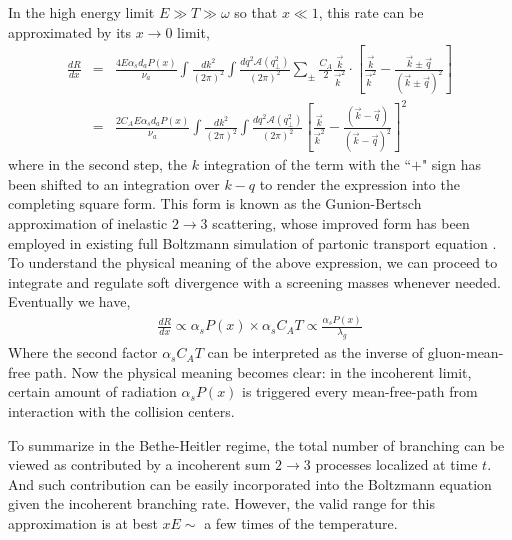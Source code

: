 In the high energy limit $E\gg T \gg \omega$ so that $x\ll 1$, this rate can be approximated by its $x\rightarrow 0$ limit, 
\begin{eqnarray}
\frac{dR}{dx} &=& \frac{4 E\alpha_s d_a P(x)}{\nu_a} \int \frac{dk^2}{(2\pi)^2} \int \frac{dq^2 \mathcal{A}(q_\perp^2)}{(2\pi)^2}  \sum_{\pm}
\frac{C_A}{2} \frac{\vec{k}}{\vec{k}^2}\cdot\left[\frac{\vec{k}}{\vec{k}^2}-\frac{\vec{k}\pm\vec{q}}{(\vec{k}\pm\vec{q})^2}\right] \\
&=& \frac{2 C_A E\alpha_s d_a P(x)}{\nu_a} \int \frac{dk^2}{(2\pi)^2} \int \frac{dq^2 \mathcal{A}(q_\perp^2)}{(2\pi)^2} 
\left[\frac{\vec{k}}{\vec{k}^2}-\frac{(\vec{k}-\vec{q})}{(\vec{k}-\vec{q})^2}\right]^2
\end{eqnarray}
where in the second step, the $k$ integration of the term with the ``$+$" sign has been shifted to an integration over $k-q$ to render the expression into the completing square form.
This form is known as the Gunion-Bertsch approximation \cite{PhysRevD.25.746} of inelastic $2\rightarrow 3$ scattering, whose improved form \cite{Fochler:2013epa,Uphoff:2014hza} has been employed in existing full Boltzmann simulation of partonic transport equation \cite{Xu:2004mz,Uphoff:2010sh}.
To understand the physical meaning of the above expression, we can proceed to integrate and regulate soft divergence with a screening masses whenever needed.
Eventually we have,
\begin{eqnarray}
\frac{dR}{dx} \propto \alpha_s P(x) \times \alpha_s C_A T \propto \frac{\alpha_s P(x)}{\lambda_g}
\label{eq:incoh-dR}
\end{eqnarray}
Where the second factor $\alpha_s C_A T$ can be interpreted as the inverse of gluon-mean-free path. 
Now the physical meaning becomes clear: in the incoherent limit, certain amount of radiation $\alpha_s P(x)$ is triggered every mean-free-path from interaction with the collision centers.

To summarize in the Bethe-Heitler regime, the total number of branching can be viewed as contributed by a incoherent sum $2\rightarrow 3$ processes localized at time $t$.
And such contribution can be easily incorporated into the Boltzmann equation given the incoherent branching rate.
However, the valid range for this approximation is at best $x E \sim$ a few times of the temperature.

